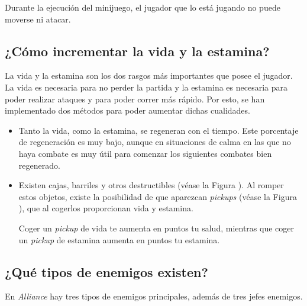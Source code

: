 Durante la ejecución del minijuego, el jugador que lo está jugando no puede moverse ni atacar.


\subsection{¿Cómo incrementar la vida y la estamina?}

La vida y la estamina son los dos rasgos más importantes que posee el jugador. La vida es necesaria para no perder la partida y la estamina es necesaria para poder realizar ataques y para poder correr más rápido. Por esto, se han implementado dos métodos para poder aumentar dichas cualidades.

\begin{itemize}
\item Tanto la vida, como la estamina, se regeneran con el tiempo. Este porcentaje de regeneración es muy bajo, aunque en situaciones de calma en las que no haya combate es muy útil para comenzar los siguientes combates bien regenerado.

\item Existen cajas, barriles y otros destructibles (véase la Figura ). Al romper estos objetos, existe la posibilidad de que aparezcan \textit{pickups} (véase la Figura ), que al cogerlos proporcionan vida y estamina.

Coger un \textit{pickup} de vida te aumenta en  puntos tu salud, mientras que coger un \textit{pickup} de estamina aumenta en  puntos tu estamina.
\end{itemize}

\subsection{¿Qué tipos de enemigos existen?}

En \textit{Alliance} hay tres tipos de enemigos principales, además de tres jefes enemigos.

